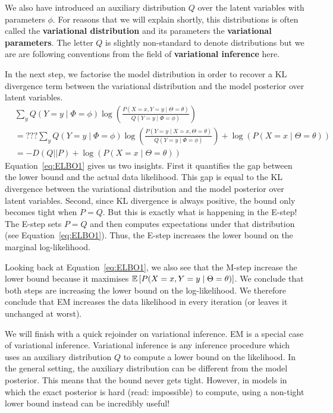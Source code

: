 We also have introduced
an auxiliary distribution $ Q $ over the latent variables with parameters $ \phi $. 
For reasons that we will explain shortly,
this distributions is often called the \textbf{variational distribution} and its parameters the
\textbf{variational parameters}. The letter $ Q $ is slightly non-standard to denote distributions but
we are are following conventions from the field of \textbf{variational inference} here.

In the next step, we factorise the model distribution in order to recover a KL divergence term between
the variational distribution and the model posterior over latent variables.
\begin{align}
&\sum_{y} Q(Y=y \mid \Phi=\phi) \log\left(\frac{P(X=x, Y=y \mid  \Theta = \theta)}{Q(Y=y \mid \Phi=\phi)}\right) \\
&=??? \sum_{y} Q(Y=y \mid \Phi=\phi) \log\left(\frac{P(Y=y \mid X=x, \Theta = \theta)}{Q(Y=y \mid \Phi=\phi)}\right) + \log(P(X=x \mid \Theta=\theta)) \\
&= -D(Q||P) + \log(P(X=x \mid \Theta=\theta)) \label{eq:ELBO2}
\end{align}
Equation~\eqref{eq:ELBO1} gives us two insights. First it quantifies the gap between the lower bound
and the actual data likelihood. This gap is equal to the KL divergence between the variational distribution
and the model posterior over latent variables. Second, since KL divergence is always positive, the bound only becomes
tight when $ P=Q $. But this is exactly what is happening in the E-step! The E-step sets $ P=Q $ and
then computes expectations under that distribution (see Equation~\eqref{eq:ELBO1}). Thus, the E-step increases
the lower bound on the marginal log-likelihood.

Looking back at Equation~\eqref{eq:ELBO1}, we also see that the M-step increase the lower bound because 
it maximises $ \mathbb{E}\left[P(X=x, Y=y\mid \Theta = \theta)\right] $. We conclude that both steps
are increasing the lower bound on the log-likelihood. We therefore conclude that EM increases the data likelihood
in every iteration (or leaves it unchanged at worst).

We will finish with a quick rejoinder on variational inference. EM is a special case of variational inference.
Variational inference is any inference procedure which uses an auxiliary distribution $ Q $ to compute
a lower bound on the likelihood. In the general setting, the auxiliary distribution can be different from the 
model posterior. This means that the bound never gets tight. However, in models in which the exact posterior 
is hard (read: impossible) to compute, using a non-tight lower bound instead can be incredibly useful!

